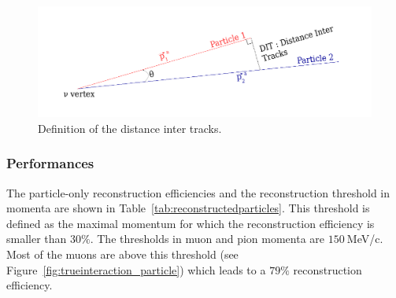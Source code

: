 \begin{figure}
  \centering
  \includegraphics[width=.7\textwidth]{fig/DistanceInterTracks.pdf}
  \caption{\label{fig:DIT} Definition of the distance inter tracks.}
\end{figure}

\subsubsection{Performances}
The particle-only reconstruction efficiencies and the reconstruction threshold in momenta are shown in Table~\ref{tab:reconstructedparticles}. This threshold is defined as the maximal momentum for which the reconstruction efficiency is smaller than $30\%$. The thresholds in muon and pion momenta are $150~$MeV/c. Most of the muons are above this threshold (see Figure~\ref{fig:trueinteraction_particle}) which leads to a $79\%$ reconstruction efficiency. 

